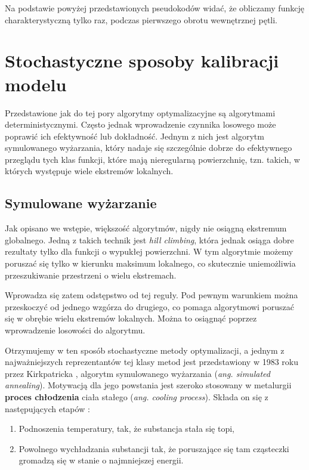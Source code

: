 \documentclass{pracamgr}
\begin{document}
Na podstawie powyżej przedstawionych pseudokodów widać, że obliczamy funkcję 
charakterystyczną tylko raz, podczas pierwszego obrotu wewnętrznej pętli.



\section{Stochastyczne sposoby kalibracji modelu}
Przedstawione jak do tej pory algorytmy optymalizacyjne są algorytmami deterministycznymi.
Często jednak wprowadzenie czynnika losowego może poprawić ich efektywność lub dokładność. Jednym z
nich jest algorytm symulowanego wyżarzania, który nadaje się szczególnie dobrze do efektywnego
przeglądu tych klas funkcji, które mają nieregularną powierzchnię, tzn. takich, w których występuje
wiele ekstremów lokalnych.

\subsection{Symulowane wyżarzanie}

Jak opisano we wstępie, większość algorytmów, nigdy nie osiągną ekstremum
globalnego. Jedną z takich technik jest \textit{hill climbing}, która jednak 
osiąga dobre rezultaty tylko dla funkcji o wypukłej powierzchni. W tym algorytmie możemy poruszać się
tylko w kierunku maksimum lokalnego, co skutecznie uniemożliwia przeszukiwanie przestrzeni o wielu
ekstremach.

Wprowadza się zatem odstępstwo od tej reguły. Pod pewnym warunkiem można przeskoczyć od 
jednego wzgórza do drugiego, co pomaga algorytmowi poruszać się w obrębie wielu ekstremów lokalnych.
Można to osiągnąć poprzez wprowadzenie losowości do algorytmu. 

Otrzymujemy w ten sposób stochastyczne metody optymalizacji, a jednym z najważniejszych 
reprezentantów tej klasy metod jest przedstawiony w 1983 roku przez Kirkpatricka 
\cite{Kirkpatrick},  algorytm symulowanego wyżarzania  (\textit{ang. simulated annealing}). 
Motywacją dla jego powstania jest szeroko stosowany w metalurgii \textbf{proces chłodzenia}
 ciała stałego (\textit{ang. cooling process}). Składa on się z
następujących etapów  \cite{ChenBin}:

\begin{enumerate}
  \item Podnoszenia temperatury, tak, że substancja stała się topi,
  \item Powolnego wychładzania substancji tak, że poruszające się tam cząsteczki gromadzą się w stanie o najmniejszej energii.
\end{enumerate}
\end{document}
